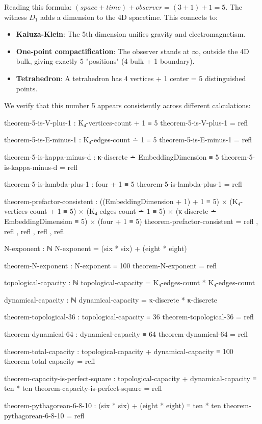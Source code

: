 \documentclass[11pt,a4paper]{book}
\def\text#1{#1}%
\begin{document}
Reading this formula: $(\text{space} + \text{time}) + \text{observer} = (3 + 1) + 1 = 5$.
The witness $D_1$ adds a dimension to the 4D spacetime. This connects to:

\begin{itemize}
\item \textbf{Kaluza-Klein}: The 5th dimension unifies gravity and electromagnetism.
\item \textbf{One-point compactification}: The observer stands at $\infty$, outside 
the 4D bulk, giving exactly 5 "positions" (4 bulk + 1 boundary).
\item \textbf{Tetrahedron}: A tetrahedron has 4 vertices + 1 center = 5 distinguished points.
\end{itemize}

We verify that this number 5 appears consistently across different calculations:

\begin{code}
theorem-5-is-V-plus-1 : K₄-vertices-count + 1 ≡ 5
theorem-5-is-V-plus-1 = refl

theorem-5-is-E-minus-1 : K₄-edges-count ∸ 1 ≡ 5
theorem-5-is-E-minus-1 = refl

theorem-5-is-kappa-minus-d : κ-discrete ∸ EmbeddingDimension ≡ 5
theorem-5-is-kappa-minus-d = refl

theorem-5-is-lambda-plus-1 : four + 1 ≡ 5
theorem-5-is-lambda-plus-1 = refl

theorem-prefactor-consistent : 
  ((EmbeddingDimension + 1) + 1 ≡ 5) ×
  (K₄-vertices-count + 1 ≡ 5) ×
  (K₄-edges-count ∸ 1 ≡ 5) ×
  (κ-discrete ∸ EmbeddingDimension ≡ 5) ×
  (four + 1 ≡ 5)
theorem-prefactor-consistent = refl , refl , refl , refl , refl
\end{code}

\begin{code}
N-exponent : ℕ
N-exponent = (six * six) + (eight * eight)

theorem-N-exponent : N-exponent ≡ 100
theorem-N-exponent = refl

topological-capacity : ℕ
topological-capacity = K₄-edges-count * K₄-edges-count

dynamical-capacity : ℕ
dynamical-capacity = κ-discrete * κ-discrete

theorem-topological-36 : topological-capacity ≡ 36
theorem-topological-36 = refl

theorem-dynamical-64 : dynamical-capacity ≡ 64
theorem-dynamical-64 = refl

theorem-total-capacity : topological-capacity + dynamical-capacity ≡ 100
theorem-total-capacity = refl

theorem-capacity-is-perfect-square : topological-capacity + dynamical-capacity ≡ ten * ten
theorem-capacity-is-perfect-square = refl

theorem-pythagorean-6-8-10 : (six * six) + (eight * eight) ≡ ten * ten
theorem-pythagorean-6-8-10 = refl
\end{code}
\end{document}
